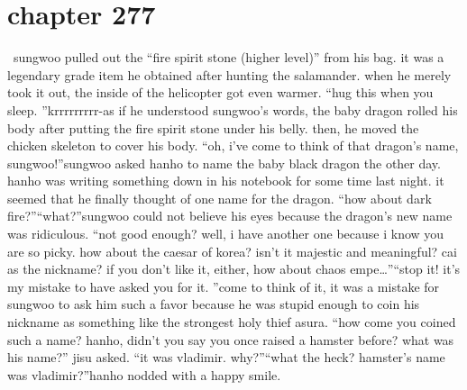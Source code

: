\section{chapter 277}






 sungwoo pulled out the “fire spirit stone (higher level)” from his bag.
 it was a legendary grade item he obtained after hunting the salamander.
 when he merely took it out, the inside of the helicopter got even warmer.
“hug this when you sleep.
”krrrrrrrrr-as if he understood sungwoo’s words, the baby dragon rolled his body after putting the fire spirit stone under his belly.
 then, he moved the chicken skeleton to cover his body.
“oh, i’ve come to think of that dragon’s name, sungwoo!”sungwoo asked hanho to name the baby black dragon the other day.
 hanho was writing something down in his notebook for some time last night.
 it seemed that he finally thought of one name for the dragon.
“how about dark fire?”“what?”sungwoo could not believe his eyes because the dragon’s new name was ridiculous.
“not good enough? well, i have another one because i know you are so picky.
 how about the caesar of korea? isn’t it majestic and meaningful? cai as the nickname? if you don’t like it, either, how about chaos empe…”“stop it! it’s my mistake to have asked you for it.
”come to think of it, it was a mistake for sungwoo to ask him such a favor because he was stupid enough to coin his nickname as something like the strongest holy thief asura.
“how come you coined such a name? hanho, didn’t you say you once raised a hamster before? what was his name?” jisu asked.
“it was vladimir.
 why?”“what the heck? hamster’s name was vladimir?”hanho nodded with a happy smile.

